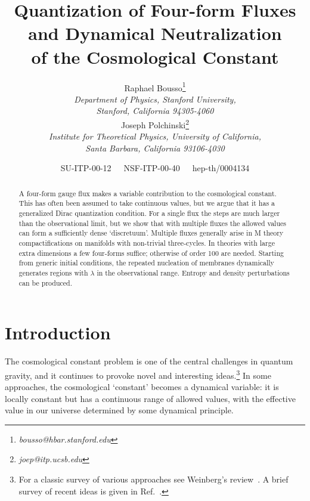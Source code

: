\documentclass[12pt]{article}
\newcommand{\sect}[1]{\setcounter{equation}{0}\section{#1}}
\begin{document}
\title{Quantization of Four-form Fluxes\\ and Dynamical
Neutralization\\ of the Cosmological Constant}

\author{
{\sc Raphael Bousso}\thanks{\it
    bousso@hbar.stanford.edu} \\[.3 ex]
    {\it Department of Physics, Stanford University,}\\
    {\it Stanford, California 94305-4060}
\\[1.4ex]
{\sc Joseph Polchinski}\thanks{\it joep@itp.ucsb.edu}
\\[.3 ex] {\it Institute for Theoretical Physics, University of
       California,}\\
  {\it Santa Barbara, California 93106-4030}
}

\date{SU-ITP-00-12~~~NSF-ITP-00-40~~~hep-th/0004134}

\maketitle

\begin{abstract}

A four-form gauge flux makes a variable contribution to the
cosmological constant.  This has often been assumed to take continuous
values, but we argue that it has a generalized Dirac quantization
condition.  For a single flux the steps are much larger than the
observational limit, but we show that with multiple fluxes the allowed
values can form a sufficiently dense `discretuum'.  Multiple fluxes
generally arise in M theory compactifications on manifolds with
non-trivial three-cycles.  In theories with large extra dimensions a
few four-forms suffice; otherwise of order 100 are needed.  Starting
from generic initial conditions, the repeated nucleation of membranes
dynamically generates regions with $\lambda$ in the observational
range.  Entropy and density perturbations can be produced.

\end{abstract}

\pagebreak



\sect{Introduction}
\label{sec-intro}

The cosmological constant problem is one of the central challenges in
quantum gravity, and it continues to provoke novel and interesting
ideas.\footnote{For a classic survey of various approaches see
Weinberg's review~\cite{Wei89}.  A brief survey of recent ideas is
given in Ref.~\cite{Wit00}.}  In some approaches, the cosmological
`constant' becomes a dynamical variable: it is locally constant but
has a continuous range of allowed values, with the effective value in
our universe determined by some dynamical principle.
\end{document}

